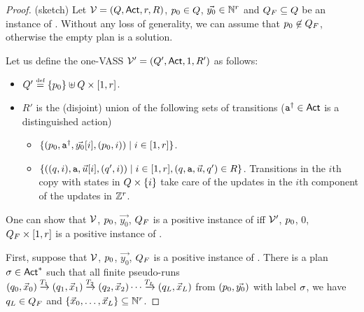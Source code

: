 \documentclass[envcountsame,a4paper,12pt]{llncs}
\begin{document}
\begin{proof} (sketch)
Let $\mathcal{V} = (Q,{\rm \sf Act},r,R)$,
$p_0 \in Q$, $\vec{y_0} \in \mathbb{N}^r$ and $Q_F \subseteq Q$
be an instance of \ourvasspb. Without any loss of generality, we can assume that
$p_0 \not \in Q_F$, otherwise the empty plan is a solution.

Let us define the one-VASS $\mathcal{V}' = (Q',{\rm \sf Act},1,R')$ as follows:
\begin{itemize}
\item $\locations' \egdef \set{\alocationbis_0} \uplus \locations \times \interval{1}{r}$.
\item $R'$ is the (disjoint) union of the following sets of transitions ($\mathtt{a}^{\dag} \in {\rm \sf Act}$ is a
  distinguished action)
  \begin{itemize}
  \item $\{ (p_0,\mathtt{a}^{\dag},\vec{y_0}[i],(p_0,i)) \mid 
    i \in [1,r] \}$.
  \item $\{ ((q,i),\mathtt{a},\vec{u}[i],(q',i)) \mid
    i \in [1,r], (q,\mathtt{a}, \vec{u},q') \in R \}$.
    Transitions in the $i$th copy with states in $Q \times \{ i \}$
    take care of the updates in the $i$th component of the updates in $\mathbb{Z}^r$. 
  \end{itemize}
\end{itemize}
One can show that
$\mathcal{V}$,
$p_0$, $\vec{y_0}$, $Q_F$
is a positive instance of \ourvasspb
iff
$\mathcal{V}'$, $p_0$, $0$, $Q_F \times [1,r]$
is a positive instance of \ourvasspb.

First, suppose that $\mathcal{V}$,
$p_0$, $\vec{y_0}$, $Q_F$
is a positive instance of \ourvasspb.
There is a plan $\sigma \in {\rm \sf Act}^*$  such that
    all finite pseudo-runs
    $\pair{\alocation_0}{\vec{x}_0} \step{\atransition_1}
\pair{\alocation_1}{\vec{x}_1} \step{\atransition_2}
\pair{\alocation_2}{\vec{x}_2} \cdots
\step{\atransition_L}
\pair{\alocation_L}{\vec{x}_L}$
from $(p_0,\vec{y_0})$ with label $\sigma$,
we have $q_L \in Q_F$ and $\{ \vec{x}_0,\ldots,\vec{x}_L \}
\subseteq \mathbb{N}^r$.


\end{proof}
\end{document}
